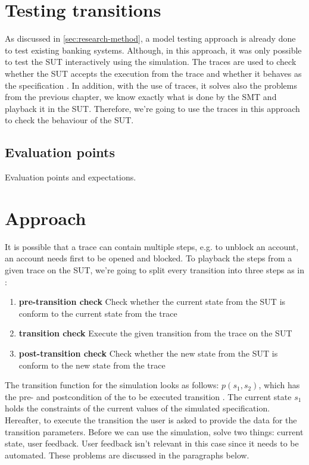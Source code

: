 \section{Testing transitions}

As discussed in \autoref{sec:research-method}, a model testing approach is
already done to test existing banking systems. Although, in this approach, it
was only possible to test the SUT interactively using the simulation. The traces
are used to check whether the SUT accepts the execution from the trace and
whether it behaves as the specification
\cite[p.5]{stoel_storm_vinju_bosman_2016}. In addition, with the use of traces,
it solves also the problems from the previous chapter, we know exactly what is
done by the SMT and playback it in the SUT. Therefore, we're going to use the
traces in this approach to check the behaviour of the SUT.

\subsection{Evaluation points}
Evaluation points and expectations.

\section{Approach}
It is possible that a trace can contain multiple steps, e.g. to unblock an
account, an account needs first to be opened and blocked. To playback the steps
from a given trace on the SUT, we're going to split every transition into three
steps as in \cite{stoel_storm_vinju_bosman_2016}:
\begin{enumerate}
\item \textbf{pre-transition check} Check whether the current state from the SUT
is conform to the current state from the trace
\item \textbf{transition check} Execute the given transition from the trace on
the SUT
\item \textbf{post-transition check} Check whether the new state from the SUT is
conform to the new state from the trace
\end{enumerate}

The transition function for the simulation looks as follows: $p(s_{1}, s_{2})$,
which has the pre- and postcondition of the to be executed transition
\cite[p.6]{stoel_storm_vinju_bosman_2016}. The current state $s_{1}$ holds the
constraints of the current values of the simulated specification. Hereafter, to
execute the transition the user is asked to provide the data for the transition
parameters. Before we can use the simulation, solve two things: current state,
user feedback. User feedback isn't relevant in this case since it needs to be
automated. These problems are discussed in the paragraphs below.

